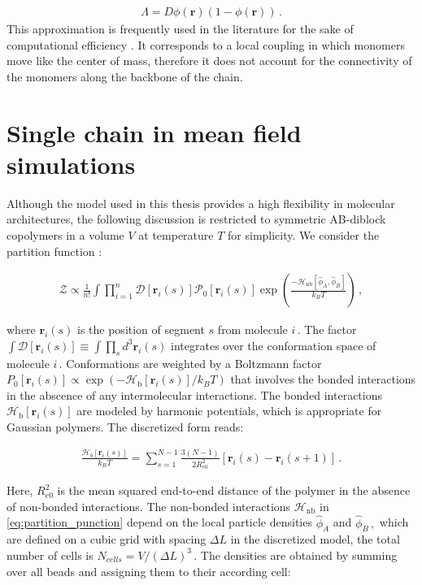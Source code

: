 \documentclass[bachelor,       %
               oneside,        %
               BCOR10mm,       %
               ngerman, english %
               ]{GAUBM}
\begin{document}
\begin{align}
  \Lambda=D\phi(\mathbf{r})(1-\phi(\mathbf{r}))\,.
  \label{eq:onsager}
\end{align}
This approximation is frequently used in the literature for the sake of computational efficiency \cite{Fraaje97,deGennes80,Binder83}. It corresponds to a local coupling in which monomers move like the center of mass, therefore it does not account for the connectivity of the monomers along the backbone of the chain. 

\section{Single chain in mean field simulations}



Although the model used in this thesis provides a high flexibility in molecular architectures, the following discussion is restricted to symmetric  AB-diblock copolymers in a volume $V$ at temperature $T$ for simplicity. We consider the partition function \cite{Daoulas06}:

\begin{align}
    \mathcal{Z}\propto\frac{1}{n!}\int{\prod_{i=1}^n\mathcal{D}[\mathbf r_i(s)]\mathcal P_0[\mathbf r_i(s)]\exp\left(\frac{-\mathcal H_{\text{nb}}[\hat\phi_A,\hat\phi_B]}{k_BT}\right)}\,,
    \label{eq:partition_punction}
\end{align}

where $\mathbf r_i(s)$ is the position of segment $s$ from molecule $i\,.$ The factor $\int\mathcal{D}[\mathbf r_i(s)]\equiv \int\prod_sd^3\mathbf r_i(s)$ integrates over the conformation space of molecule $i\,.$ Conformations are weighted by a Boltzmann factor $P_0[\mathbf r_i(s)]\propto\exp\left(-\mathcal H_{\text{b}}[\mathbf r_i(s)]/k_BT\right)$ that involves the bonded interactions in the abscence of any intermolecular interactions. The bonded interactions $\mathcal H_{\text{b}}[\mathbf r_i(s)]$ are modeled by harmonic potentials, which is appropriate for Gaussian polymers. The discretized form reads:

\begin{align}
    \frac{\mathcal H_b[\mathbf r_i(s)]}{k_BT}=\sum_{s=1}^{N-1}\frac{3(N-1)}{2R_{e0}^2}[\mathbf r_i(s)-\mathbf r_i(s+1)]\,.
\end{align}

Here, $R_{e0}^2$ is the mean squared end-to-end distance of the polymer in the absence of non-bonded interactions. The non-bonded interactions $\mathcal H_\text{nb}$ in \autoref{eq:partition_punction} depend on the local particle densities $\hat\phi_A$ and $\hat\phi_B\,,$ which are defined on a cubic grid with spacing $\Delta L$ in the discretized model, the total number of cells is $N_{cells}=V/(\Delta L)^3\,.$ The densities are obtained by summing over all beads and assigning them to their according cell:
\end{document}
